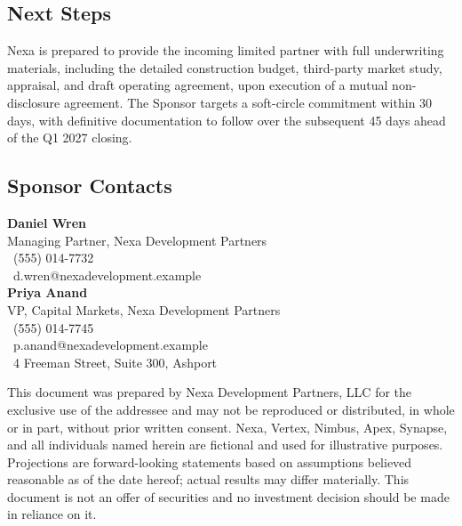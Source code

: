 \noindent
\begin{minipage}[t]{0.48\textwidth}
  \subsection*{Next Steps}
  Nexa is prepared to provide the incoming limited partner with full underwriting materials,
  including the detailed construction budget, third-party market study, appraisal, and draft
  operating agreement, upon execution of a mutual non-disclosure agreement. The Sponsor targets
  a soft-circle commitment within 30 days, with definitive documentation to follow over the
  subsequent 45 days ahead of the Q1 2027 closing.
\end{minipage}\hfill
\begin{minipage}[t]{0.48\textwidth}
  \subsection*{Sponsor Contacts}
  {\raggedright\sffamily\small
  \textbf{Daniel Wren}\\
  Managing Partner, Nexa Development Partners\\
  \faPhone\ (555) 014-7732\\
  \faEnvelope\ d.wren@nexadevelopment.example\\[6pt]
  \textbf{Priya Anand}\\
  VP, Capital Markets, Nexa Development Partners\\
  \faPhone\ (555) 014-7745\\
  \faEnvelope\ p.anand@nexadevelopment.example\\[6pt]
  \faMapMarker\ 4 Freeman Street, Suite 300, Ashport
  }
\end{minipage}
\par

\vspace{4pt}
{\scriptsize\sffamily\color{jvsage}
This document was prepared by Nexa Development Partners, LLC for the exclusive use of the
addressee and may not be reproduced or distributed, in whole or in part, without prior written
consent. Nexa, Vertex, Nimbus, Apex, Synapse, and all individuals named herein are fictional and
used for illustrative purposes. Projections are forward-looking statements based on assumptions
believed reasonable as of the date hereof; actual results may differ materially. This document
is not an offer of securities and no investment decision should be made in reliance on it.
}
